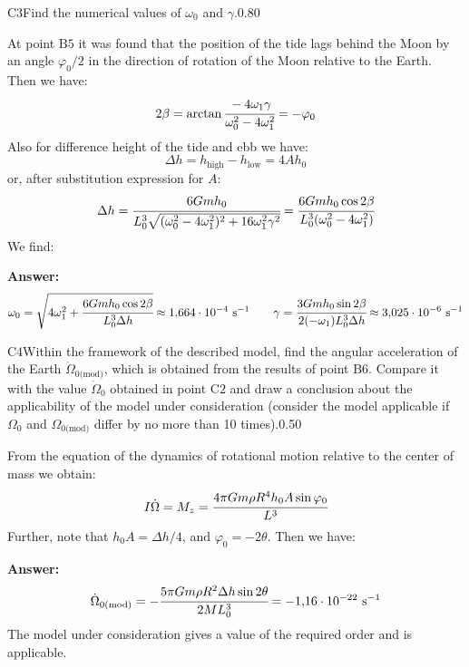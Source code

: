 \documentclass[11pt,a4paper]{article}
\begin{document}
\begin{solcard}{C3}{Find the numerical values of $\omega_0$ and $\gamma$.}{0.80}

At point $\mathrm{B5}$ it was found that the position of the tide lags behind the Moon by an angle $\varphi_0/2$ in the direction of rotation of the Moon relative to the Earth. Then we have: $$2\beta=\arctan\cfrac{-4\omega_1\gamma}{\omega^2_0-4\omega^2_1}=-\varphi_0 $$ Also for difference height of the tide and ebb we have: $$\Delta{h}=h_\text{high}-h_\text{low}=4Ah_0 $$ or, after substitution expression for $A$: $$\Delta{h}=\cfrac{6Gmh_0}{L^3_0\sqrt{(\omega^2_0-4\omega^2_1)^2+16\omega^2_1\gamma^2}}=\cfrac{6Gmh_0\cos 2\beta}{L^3_0(\omega^2_0-4\omega^2_1)} $$ We find:

\par\smallskip\noindent\textbf{Answer:} $$\omega_0=\sqrt{4\omega^2_1+\cfrac{6Gmh_0\cos 2\beta}{L^3_0\Delta{h}}}\approx 1{,}664\cdot{10^{-4}}~\text{s}^{-1}\qquad \gamma=\cfrac{3Gmh_0\sin 2\beta}{2(-\omega_1)L^3_0\Delta{h}}\approx 3{,}025\cdot{10^{-6}}~\text{s}^{-1} $$
\end{solcard}

\begin{solcard}{C4}{Within the framework of the described model, find the angular acceleration of the Earth $\dot{\Omega}_{0\text{(mod)}}$, which is obtained from the results of point $\mathrm{B6}$. Compare it with the value $\dot{\Omega}_0$ obtained in point $\mathrm{C2}$ and draw a conclusion about the applicability of the model under consideration (consider the model applicable if $\Omega_0$ and $\Omega_{0\text{(mod)}}$ differ by no more than 10 times).}{0.50}

From the equation of the dynamics of rotational motion relative to the center of mass we obtain: $$I\dot{\Omega}=M_z=\cfrac{4\pi Gm\rho R^4h_0A\sin\varphi_0}{L^3} $$ Further, note that $h_0 A = \Delta h/4$, and $\varphi_0 = -2\theta$. Then we have:

\par\smallskip\noindent\textbf{Answer:} $$\dot{\Omega}_{0\text{(mod)}}=-\cfrac{5\pi Gm\rho{R}^2\Delta{h}\sin 2\theta}{2ML^3_0}=-1{,}16\cdot{10^{-22}}~\text{s}^{-1} $$ The model under consideration gives a value of the required order and is applicable.
\end{solcard}
\end{document}
